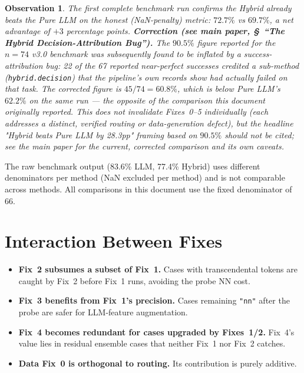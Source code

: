 \documentclass[twoside,11pt]{article}
\newtheorem{observation}{Observation}
\begin{document}
\begin{observation}
The first complete benchmark run confirms the Hybrid already
\emph{beats} the Pure LLM on the honest (NaN-penalty) metric:
$72.7\%$ vs $69.7\%$, a net advantage of $+3$ percentage points.
\textbf{Correction (see main paper, \S~``The Hybrid Decision-Attribution
Bug'').} The $90.5\%$ figure reported for the $n=74$ v3.0 benchmark was
subsequently found to be inflated by a success-attribution bug: 22 of the
67 reported near-perfect successes credited a sub-method
(\texttt{hybrid.decision}) that the pipeline's own records show had
actually failed on that task. The corrected figure is $45/74 = 60.8\%$,
which is \emph{below} Pure LLM's $62.2\%$ on the same run --- the opposite
of the comparison this document originally reported. This does not
invalidate Fixes~0--5 individually (each addresses a distinct, verified
routing or data-generation defect), but the headline "Hybrid beats Pure
LLM by 28.3pp" framing based on $90.5\%$ should not be cited; see the main
paper for the current, corrected comparison and its own caveats.
\end{observation}

\begin{remark}
The raw benchmark output (83.6\% LLM, 77.4\% Hybrid) uses different
denominators per method (NaN excluded per method) and is not comparable
across methods.  All comparisons in this document use the fixed denominator
of 66.
\end{remark}

\section{Interaction Between Fixes}
\label{sec:interactions}

\begin{itemize}[leftmargin=*]
  \item \textbf{Fix~2 subsumes a subset of Fix~1.}  Cases with transcendental
    tokens are caught by Fix~2 before Fix~1 runs, avoiding the probe NN cost.
  \item \textbf{Fix~3 benefits from Fix~1's precision.}  Cases remaining
    \texttt{"nn"} after the probe are safer for LLM-feature augmentation.
  \item \textbf{Fix~4 becomes redundant for cases upgraded by Fixes~1/2.}
    Fix~4's value lies in residual ensemble cases that neither Fix~1 nor
    Fix~2 catches.
  \item \textbf{Data Fix~0 is orthogonal to routing.}  Its contribution
    is purely additive.
\end{itemize}
\end{document}
